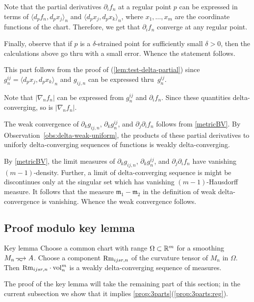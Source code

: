 Note that the partial derivatives $\partial_if_n$ at a regular point $p$ can be expressed in terms of $\langle d_pf_n,d_px_j\rangle_n$ and $\langle d_px_j,d_px_k\rangle_n$, where $x_1,\dots,x_m$ are the coordinate functions of the chart.
Therefore, we get that $\partial_if_n$ converge at any regular point.

Finally, observe that if $p$ is a $\delta$-strained point for sufficiently small $\delta>0$,
then the calculations above go thru with a small error.
Whence the statement follows.

 This part follows from the proof of (\ref{lem:test-delta-partial}) since $g^{ij}_n=\langle d_px_j,d_px_k\rangle_n$ and $g_{ij,n}$ can be expressed thru~$g^{ij}_n$.

Note that $|\nabla_n f_n|$ can be expressed from $g^{ij}_n$ and $\partial_if_n$.
Since these quantities delta-converging, so is $|\nabla_n f_n|$.

 The weak convergence of $\partial_kg_{ij,n}$, $\partial_k g^{ij}_n$, and $\partial_j\partial_if_n$
follows from \ref{metricBV}.
By Observation~\ref{obs:delta-weak-uniform}, the products of these partial derivatives to uniforly delta-converging sequences of functions is weakly delta-converging.

By \ref{metricBV}, the limit measures of $\partial_kg_{ij,n}$, $\partial_k g^{ij}_n$, and $\partial_j\partial_if_n$ have vanishing $(m-1)$-density.
Further, a limit of delta-converging sequence is might be discontinues only at the singular set which has vanishing $(m-1)$-Hausdorff measure.
It follows that the measure $\mathfrak{m}_1-\mathfrak{m}_2$ in the definition of weak delta-convergence is vanishing. 
Whence the weak convergence follows.
\qeds

\subsection{Proof modulo key lemma}

\begin{thm}{Key lemma}\label{A^0}
Choose a common chart with range $\Omega\subset \mathbb{R}^m$ for a smoothing $M_n\smooths{} A$.
Choose a component $\operatorname{\rm Rm}_{ijsr,n}$ of the curvature tensor of $M_n$ in $\Omega$.
Then $\Rm_{ijsr,n}\cdot \vol^m_n$ is a weakly delta-converging sequence of measures.
\end{thm}

The proof of the key lemma will take the remaining part of this section;
in the current subsection we show that it implies \ref{prop:3parts}(\ref{prop:3parts:reg}).

